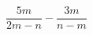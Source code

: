 \begin{ex}[type=expressions]
	\begin{condition}
		\( \dfrac{5m}{2m-n}-\dfrac{3m}{n-m} \)
	\end{condition}
\end{ex}